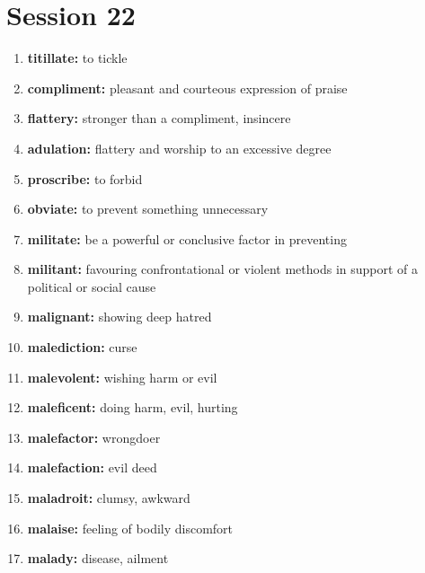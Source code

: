 \documentclass{article}
\begin{document}
\section{Session 22}
\begin{enumerate}
    \item \textbf{titillate: }{to tickle}
    \item \textbf{compliment: }{pleasant and courteous expression of praise}
    \item \textbf{flattery: }{stronger than a compliment, insincere}
    \item \textbf{adulation: }{flattery and worship to an excessive degree}
    \item \textbf{proscribe: }{to forbid}
    \item \textbf{obviate: }{to prevent something unnecessary}
    \item \textbf{militate: }{be a powerful or conclusive factor in preventing}
    \item \textbf{militant: }{favouring confrontational or violent methods in support of a political or social cause}
    \item \textbf{malignant: }{showing deep hatred}
    \item \textbf{malediction: }{curse}
    \item \textbf{malevolent: }{wishing harm or evil}
    \item \textbf{maleficent: }{doing harm, evil, hurting}
    \item \textbf{malefactor: }{wrongdoer}
    \item \textbf{malefaction: }{evil deed}
    \item \textbf{maladroit: }{clumsy, awkward}
    \item \textbf{malaise: }{feeling of bodily discomfort}
    \item \textbf{malady: }{disease, ailment}
    
\end{enumerate}
\end{document}
